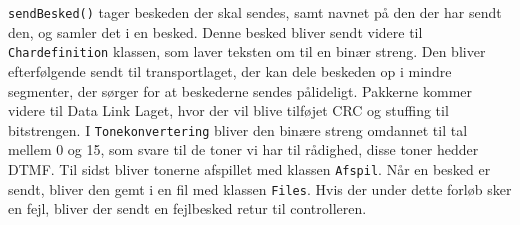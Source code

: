 \newline
\texttt{sendBesked()} tager beskeden der skal sendes, samt navnet på den der har sendt den, og samler det i en besked. Denne besked bliver sendt videre til \texttt{Chardefinition} klassen, som laver teksten om til en binær streng. Den bliver efterfølgende sendt til transportlaget, der kan dele beskeden op i mindre segmenter, der sørger for at beskederne sendes pålideligt. Pakkerne kommer videre til Data Link Laget, hvor der vil blive tilføjet CRC og stuffing til bitstrengen. I \texttt{Tonekonvertering} bliver den binære streng omdannet til tal mellem 0 og 15, som svare til de toner vi har til rådighed, disse toner hedder DTMF. Til sidst bliver tonerne afspillet med klassen \texttt{Afspil}. Når en besked er sendt, bliver den gemt i en fil med klassen \texttt{Files}. Hvis der under dette forløb sker en fejl, bliver der sendt en fejlbesked retur til controlleren.

